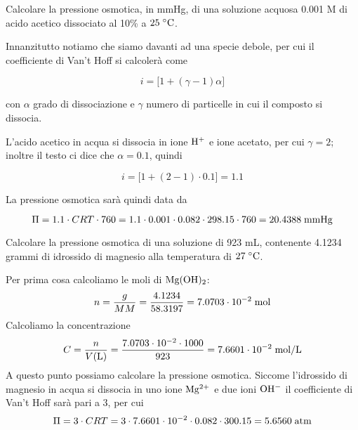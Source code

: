 \begin{esercizio}
    Calcolare la pressione osmotica, in mmHg, di una soluzione acquosa 0.001 M di acido acetico dissociato al 10\% a $25 \; ^{\circ} \rm C$.
\end{esercizio}
\begin{soluzione}
    Innanzitutto notiamo che siamo davanti ad una specie debole, per cui il coefficiente di Van't Hoff si calcolerà come

$$i=\big[1 + (\gamma -1)\alpha\big]$$

con $\alpha$ grado di dissociazione e $\gamma$ numero di particelle in cui il composto si dissocia.

L'acido acetico in acqua si dissocia in ione $\rm H^+$ e ione acetato, per cui $\gamma=2$; inoltre il testo ci dice che $\alpha=0.1$, quindi

$$i=\big[1 + (2-1) \cdot 0.1\big]=1.1$$

La pressione osmotica sarà quindi data da

$$\Pi=1.1 \cdot CRT \cdot 760
=1.1 \cdot 0.001 \cdot 0.082 \cdot 298.15 \cdot 760=20.4388 \; \rm mmHg$$

\end{soluzione}

\newpage

\begin{esercizio}
    Calcolare la pressione osmotica di una soluzione di 923 mL, contenente 4.1234 grammi di idrossido di magnesio alla temperatura di $27 \; \rm ^{\circ} C$.
\end{esercizio}
\begin{soluzione}
    Per prima cosa calcoliamo le moli di $\rm Mg(OH)_2$:
    \begin{equation*}
        n=\frac{g}{MM}=\frac{4.1234}{58.3197}=7.0703 \cdot 10^{-2} \; \rm mol
    \end{equation*}
    Calcoliamo la concentrazione
    \begin{equation*}
        C=\frac{n}{V(\text{L})}
        =\frac{7.0703 \cdot 10^{-2} \cdot 1000}{923}
        =7.6601 \cdot 10^{-2} \; \rm mol/L
    \end{equation*}
    A questo punto possiamo calcolare la pressione osmotica. Siccome l'idrossido di magnesio in acqua si dissocia in uno ione $\rm Mg^{2+}$ e due ioni $\rm OH^-$ il coefficiente di Van't Hoff sarà pari a 3, per cui
    \begin{equation*}
        \Pi=3 \cdot CRT
        =3 \cdot 7.6601 \cdot 10^{-2} \cdot 0.082 \cdot 300.15
        =5.6560 \; \rm atm
    \end{equation*}
\end{soluzione}

